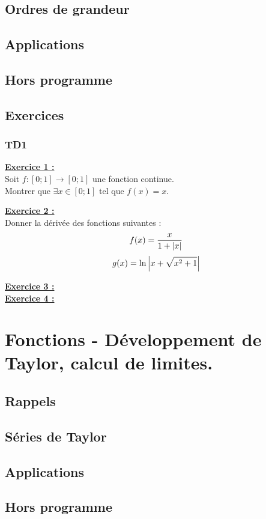 \section{Ordres de grandeur}\label{comp/ord:ord}
\section{Applications}\label{comp/ord:app}
\section{Hors programme}\label{comp/ord:further}
\section{Exercices}
\subsection{TD1}
\textbf{\underline{Exercice 1 :}}\\
Soit \(f\colon[0;1]\longrightarrow[0;1]\) une fonction continue.\\
Montrer que \(\exists x\in[0;1]\text{ tel que }f(x)=x\).

\textbf{\underline{Exercice 2 :}}\\
Donner la dérivée des fonctions suivantes :\\
\begin{equation}
    f(x)=\frac{x}{1+\abs{x}}
\end{equation}
\begin{equation}
    g(x)=\ln\abs{x+\sqrt{x^2+1}}
\end{equation}

\textbf{\underline{Exercice 3 :}}\\

\textbf{\underline{Exercice 4 :}}\\
\chapter{Fonctions - Développement de Taylor, calcul de limites.}\label{taylor}
\section{Rappels}\label{taylor:reminders}
\section{Séries de Taylor}\label{taylor:taylor}
\section{Applications}\label{taylor:app}
\section{Hors programme}\label{comp/ord:further}